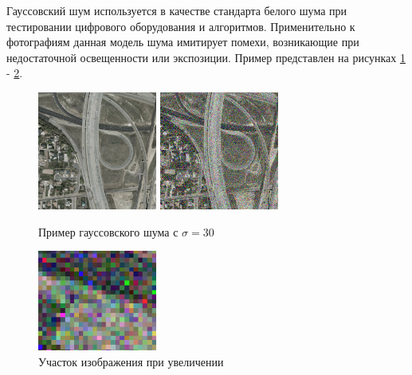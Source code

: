 {	Гауссовский шум используется в качестве стандарта белого шума при тестировании цифрового оборудования и алгоритмов.	Применительно к фотографиям данная модель шума имитирует помехи, возникающие при недостаточной освещенности или экспозиции. Пример представлен на рисунках \ref{noises_gauss} - \ref{noises_gauss_big}.
 
	\begin{figure}[H]
		\centering                             
		\includegraphics[width=0.35\textwidth,keepaspectratio]{noises/original.jpg}   
		\includegraphics[width=0.35\textwidth,keepaspectratio]{noises/gauss.jpg}                 
		\centering\caption{ Пример гауссовского шума с $\sigma=30$ }
		\label{noises_gauss}                           
	\end{figure}    

	\begin{figure}[H]
		\centering                             
		\includegraphics[width=0.35\textwidth,keepaspectratio]{noises/gauss_big.jpg}                   
		\centering\caption{ Участок изображения при увеличении }
		\label{noises_gauss_big}                           
	\end{figure}    
	
}
